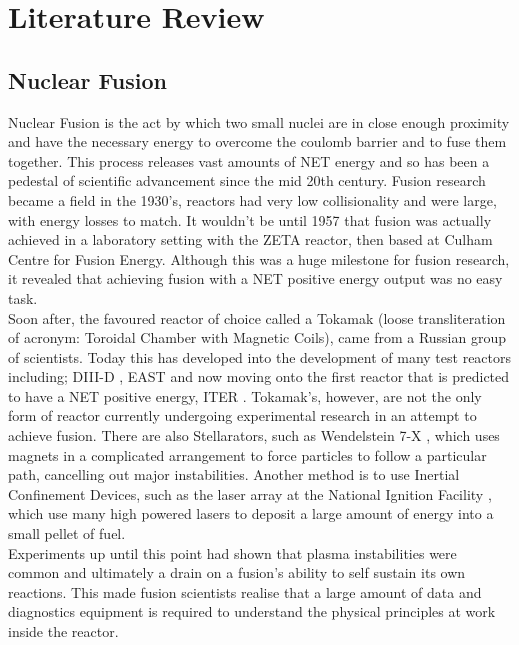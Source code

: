 \documentclass[12pt,a4paper,oneside]{report}
\begin{document}

\chapter{Literature Review}
	\section{Nuclear Fusion}
Nuclear Fusion is the act by which two small nuclei are in close enough proximity and have the necessary energy to overcome the coulomb barrier and to fuse them together. This process releases vast amounts of NET energy and so has been a pedestal of scientific advancement since the mid 20th century. Fusion research became a field in the 1930's, reactors had very low collisionality and were large, with energy losses to match. It wouldn't be until 1957 that fusion was actually achieved in a laboratory setting with the ZETA reactor, then based at Culham Centre for Fusion Energy. Although this was a huge milestone for fusion research, it revealed that achieving fusion with a NET positive energy output was no easy task. \\
Soon after, the favoured reactor of choice called a Tokamak (loose transliteration of acronym: Toroidal Chamber with Magnetic Coils), came from a Russian group of scientists. Today this has developed into the development of many test reactors including; DIII-D \cite{AymarOverviewExperiment} , EAST \cite{Gao2008DiagnosticsTokamak} and now moving onto the first reactor that is predicted to have a NET positive energy, ITER \cite{Litaudon2017OverviewITER}. Tokamak's, however, are not the only form of reactor currently undergoing experimental research in an attempt to achieve fusion. There are also Stellarators, such as Wendelstein 7-X \cite{Klinger2016Wendelstein7-X}, which uses magnets in a complicated arrangement to force particles to follow a particular path, cancelling out major instabilities. Another method is to use Inertial Confinement Devices, such as the laser array at the National Ignition Facility \cite{Lindl1995DevelopmentGain}, which use many high powered lasers to deposit a large amount of energy into a small pellet of fuel. 
\\
Experiments up until this point had shown that plasma instabilities were common and ultimately a drain on a fusion's ability to self sustain its own reactions. This made fusion scientists realise that a large amount of data and diagnostics equipment is required to understand the physical principles at work inside the reactor.
\\
\end{document}
